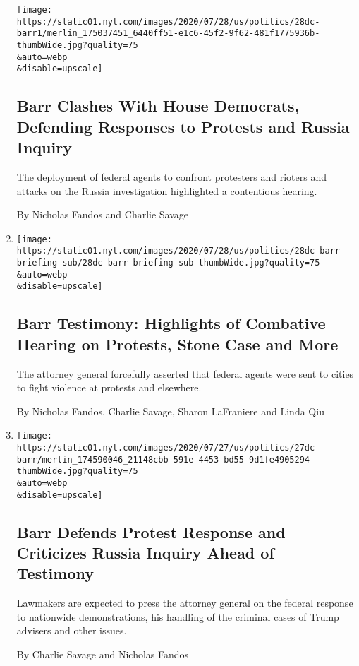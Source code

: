 \begin{enumerate}
  \texttt{[image: https://static01.nyt.com/images/2020/07/28/us/politics/28dc-barr1/merlin\_175037451\_6440ff51-e1c6-45f2-9f62-481f1775936b-thumbWide.jpg?quality=75\\\&auto=webp\\\&disable=upscale]}

  \hypertarget{barr-clashes-with-house-democrats-defending-responses-to-protests-and-russia-inquiry}{%
  \subsection{Barr Clashes With House Democrats, Defending Responses to
  Protests and Russia
  Inquiry}\label{barr-clashes-with-house-democrats-defending-responses-to-protests-and-russia-inquiry}}

  The deployment of federal agents to confront protesters and rioters
  and attacks on the Russia investigation highlighted a contentious
  hearing.

  By Nicholas Fandos and Charlie Savage
\item
  \href{/2020/07/28/us/politics/william-barr-house-judiciary-hearing.html}{}

  \texttt{[image: https://static01.nyt.com/images/2020/07/28/us/politics/28dc-barr-briefing-sub/28dc-barr-briefing-sub-thumbWide.jpg?quality=75\\\&auto=webp\\\&disable=upscale]}

  \hypertarget{barr-testimony-highlights-of-combative-hearing-on-protests-stone-case-and-more}{%
  \subsection{Barr Testimony: Highlights of Combative Hearing on
  Protests, Stone Case and
  More}\label{barr-testimony-highlights-of-combative-hearing-on-protests-stone-case-and-more}}

  The attorney general forcefully asserted that federal agents were sent
  to cities to fight violence at protests and elsewhere.

  By Nicholas Fandos, Charlie Savage, Sharon LaFraniere and Linda Qiu
\item
  \href{/2020/07/27/us/politics/william-barr-house-judiciary-hearing.html}{}

  \texttt{[image: https://static01.nyt.com/images/2020/07/27/us/politics/27dc-barr/merlin\_174590046\_21148cbb-591e-4453-bd55-9d1fe4905294-thumbWide.jpg?quality=75\\\&auto=webp\\\&disable=upscale]}

  \hypertarget{barr-defends-protest-response-and-criticizes-russia-inquiry-ahead-of-testimony}{%
  \subsection{Barr Defends Protest Response and Criticizes Russia
  Inquiry Ahead of
  Testimony}\label{barr-defends-protest-response-and-criticizes-russia-inquiry-ahead-of-testimony}}

  Lawmakers are expected to press the attorney general on the federal
  response to nationwide demonstrations, his handling of the criminal
  cases of Trump advisers and other issues.

  By Charlie Savage and Nicholas Fandos
\end{enumerate}

